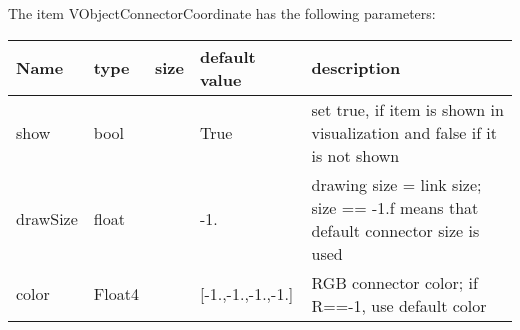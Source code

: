The item VObjectConnectorCoordinate has the following parameters:
\begin{center}
  \footnotesize
  \begin{longtable}{| p{4.5cm} | p{2.5cm} | p{0.5cm} | p{2.5cm} | p{6cm} |}
    \hline
    \bf Name & \bf type & \bf size & \bf default value & \bf description \\ \hline
    show &     bool &      &     True &     set true, if item is shown in visualization and false if it is not shown\\ \hline
    drawSize &     float &      &     -1. &     drawing size = link size; size == -1.f means that default connector size is used\\ \hline
    color &     Float4 &      &     [-1.,-1.,-1.,-1.] &     RGB connector color; if R==-1, use default color\\ \hline
	  \end{longtable}
	\end{center}

